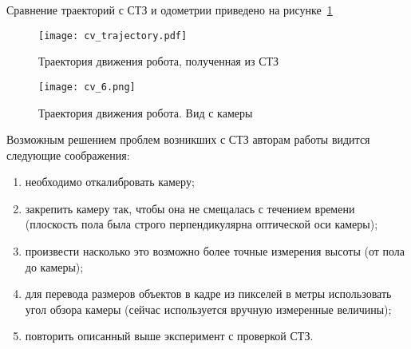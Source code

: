 \clearpage
Сравнение траекторий с СТЗ и одометрии приведено на рисунке~\ref{cv_trajectory}
\begin{figure}[h]
	\centering
	\texttt{[image: cv\_trajectory.pdf]}
	\caption{Траектория движения робота, полученная из СТЗ}
	\label{cv_trajectory}
\end{figure}

\begin{figure}[h]
	\centering
	\texttt{[image: cv\_6.png]}
	\caption{Траектория движения робота. Вид с камеры}
	\label{cv_trajectory_real}
\end{figure}

Возможным решением проблем возникших с СТЗ авторам работы видится следующие соображения:
\begin{enumerate}
	\item необходимо откалибровать камеру;
	\item закрепить камеру так, чтобы она не смещалась с течением времени (плоскость пола была строго перпендикулярна оптической оси камеры);
	\item произвести насколько это возможно более точные измерения высоты (от пола до камеры);
	\item для перевода размеров объектов в кадре из пикселей в метры использовать угол обзора камеры (сейчас используется вручную измеренные величины);
	\item повторить описанный выше эксперимент с проверкой СТЗ.
\end{enumerate}